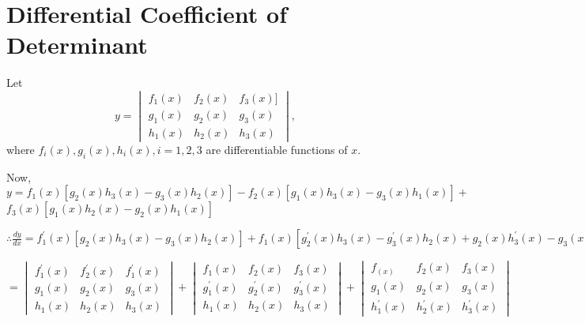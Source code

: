 \section{Differential Coefficient of Determinant}
Let $$y = \begin{vmatrix}f_1(x) & f_2(x) & f_3(x)]\\g_1(x) & g_2(x) &
g_3(x)\\h_1(x) & h_2(x) & h_3(x)\end{vmatrix},$$ where $f_i(x), g_i(x),
h_i(x), i= 1, 2, 3$ are differentiable functions of $x.$

Now, $y = f_1(x)[g_2(x)h_3(x) - g_3(x)h_2(x)] - f_2(x)[g_1(x)h_3(x) -
g_3(x)h_1(x)] +$ $f_3(x)[g_1(x)h_2(x) - g_2(x)h_1(x)]$

$\therefore \frac{dy}{dx} = f_1^{\prime}(x)[g_2(x)h_3(x) -
g_3(x)h_2(x)] + f_1(x)[g_2^{\prime}(x)h_3(x) - g_3^{\prime}(x)h_2(x) +
g_2(x)h_3^{\prime}(x) - g_3(x)h_2^{\prime}(x)] +
-f_2^{\prime}(x)[g_1(x)h_3(x) - g_3(x)h_1(x)] +
-f_2(x)[g_1^{\prime}(x)h_3(x) - g_1(x)h_3^{\prime}(x) +
g_1(x)h_3^{\prime}(x) - g_3(x)h_3^{\prime}(x)] +
f_3^{\prime}(x)[g_1(x)h_2(x) - g_2(x)h_1(x)] +
f_3(x)[g_1^{\prime}(x)h_2(x) - g_2^{\prime}(x)h_1(x)x +
g_1(x)h_2^{\prime}(x) - g_2(x)h_1^{\prime}(x)]$

$$= \begin{vmatrix}f_1^{\prime}(x) & f_2^{\prime}(x) &
f_1^{\prime}(x)\\g_1(x) & g_2(x) & g_3(x)\\h_1(x) & h_2(x) &
h_3(x)\end{vmatrix} + \begin{vmatrix}f_1(x) & f_2(x) & f_3(x)\\g_1^{\prime}(x)
& g_2^{\prime}(x) & g_3^{\prime}(x) \\h_1(x) & h_2(x) & h_3(x) \end{vmatrix} +
\begin{vmatrix}f_(x) & f_2(x) & f_3(x)\\g_1(x) & g_2(x) &
g_3(x)\\h_1^{\prime}(x) & h_2^{\prime}(x) & h_3^{\prime}(x)\end{vmatrix}$$
